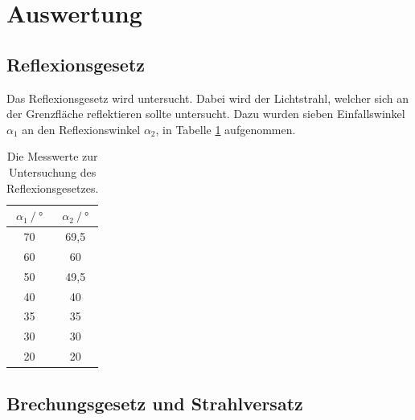 \section{Auswertung} 

\subsection{Reflexionsgesetz}

\begin{flushleft}
    Das Reflexionsgesetz wird untersucht. Dabei wird der Lichtstrahl, welcher sich an der Grenzfläche reflektieren sollte untersucht.
    Dazu wurden sieben Einfallswinkel $\alpha_{1}$ an den Reflexionswinkel $\alpha_{2}$, in Tabelle \ref{Tabelle2} aufgenommen.
\end{flushleft}

\begin{table}[H]
    \centering
    \caption{Die Messwerte zur Untersuchung des Reflexionsgesetzes.} 
    \label{Tabelle2}
    \begin{tabular} {c  c}
        \toprule
        {$ \alpha_{1} \mathbin{/} \unit{\degree} $} &
        {$ \alpha_{2} \mathbin{/} \unit{\degree} $} \\
        \midrule
        70 & 69,5 \\
        60 & 60 \\
        50 & 49,5 \\
        40 & 40 \\
        35 & 35 \\
        30 & 30 \\
        20 & 20 \\
        \bottomrule
    \end{tabular} 
\end{table}

\subsection{Brechungsgesetz und Strahlversatz}

